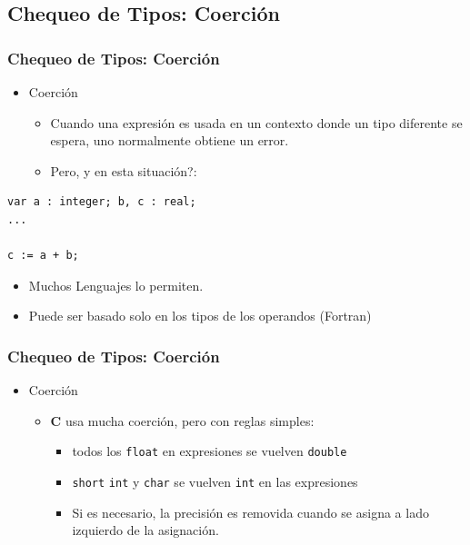 \documentclass[11pt]{article}
\begin{document}
\subsection*{Chequeo de Tipos: Coerción}
\label{sec:orgheadline12}

\subsubsection*{Chequeo de Tipos: Coerción}
\label{sec:orgheadline8}
\begin{itemize}
\item Coerción
\begin{itemize}
\item Cuando una expresión es usada en un contexto donde un tipo
diferente se espera, uno normalmente obtiene un error.
\item Pero, y en esta situación?:
\end{itemize}
\end{itemize}
\begin{verbatim}
var a : integer; b, c : real;
...

c := a + b;
\end{verbatim}
\begin{itemize}
\item Muchos Lenguajes lo permiten.
\item Puede ser basado solo en los tipos de los operandos (Fortran)
\end{itemize}
\subsubsection*{Chequeo de Tipos: Coerción}
\label{sec:orgheadline9}
\begin{itemize}
\item Coerción
\begin{itemize}
\item \textbf{C} usa mucha coerción, pero con reglas simples:
\begin{itemize}
\item todos los \texttt{float}  en expresiones se vuelven \texttt{double}
\item \texttt{short} \texttt{int} y \texttt{char} se vuelven \texttt{int} en las expresiones
\item Si es necesario, la precisión es removida cuando se asigna a
lado izquierdo de la asignación.
\end{itemize}
\end{itemize}
\end{itemize}
\end{document}
